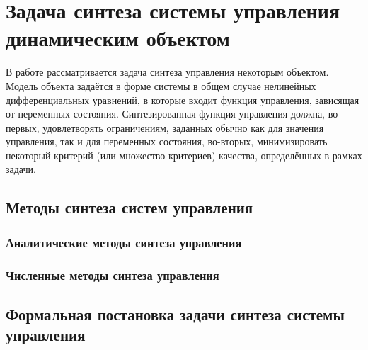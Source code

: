 \chapter{Задача синтеза системы управления динамическим объектом} \label{chapter:synthesis_problem}

В работе рассматривается задача синтеза управления некоторым объектом.
Модель объекта задаётся в форме системы в общем случае нелинейных дифференциальных уравнений, в которые входит функция управления, зависящая от переменных состояния.
Синтезированная функция управления должна, во-первых, удовлетворять ограничениям, заданных обычно как для значения управления, так и для переменных состояния, во-вторых, минимизировать некоторый критерий (или множество критериев) качества, определённых в рамках задачи.

\section{Методы синтеза систем управления} \label{sect:synthesis_methods}

\subsection{Аналитические методы синтеза управления}

\subsection{Численные методы синтеза управления}

\section{Формальная постановка задачи синтеза системы управления} \label{sect:formal_synthesis}

\clearpage
